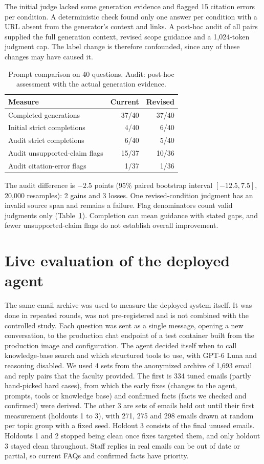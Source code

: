 \documentclass[a4paper,10pt,twocolumn]{article}
\begin{document}
The initial judge lacked some generation evidence and flagged 15 citation errors per condition. A deterministic check found only one answer per condition with a URL absent from the generator's context and links. A post-hoc audit of all pairs supplied the full generation context, revised scope guidance and a 1,024-token judgment cap. The label change is therefore confounded, since any of these changes may have caused it.
\begin{table}[t]
\centering\small
\caption{Prompt comparison on 40 questions. Audit: post-hoc assessment with the actual generation evidence.}\label{tab:followup}
\begin{tabular}{lrr}
\toprule
Measure & Current & Revised\\
\midrule
Completed generations & 37/40 & 37/40\\
Initial strict completions & 4/40 & 6/40\\
Audit strict completions & 6/40 & 5/40\\
Audit unsupported-claim flags & 15/37 & 10/36\\
Audit citation-error flags & 1/37 & 1/36\\
\bottomrule
\end{tabular}
\end{table}

The audit difference is $-2.5$ points (95\% paired bootstrap interval $[-12.5,7.5]$, 20,000 resamples): 2 gains and 3 losses. One revised-condition judgment has an invalid source span and remains a failure. Flag denominators count valid judgments only (Table~\ref{tab:followup}). Completion can mean guidance with stated gaps, and fewer unsupported-claim flags do not establish overall improvement.


\section{Live evaluation of the deployed agent}\label{sec:live}
The same email archive was used to measure the deployed system itself. It was done in repeated rounds, was not pre-registered and is not combined with the controlled study. Each question was sent as a single message, opening a new conversation, to the production chat endpoint of a test container built from the production image and configuration. The agent decided itself when to call knowledge-base search and which structured tools to use, with GPT-6 Luna and reasoning disabled. We used 4 sets from the anonymized archive of 1,693 email and reply pairs that the faculty provided. The first is 334 tuned emails (partly hand-picked hard cases), from which the early fixes (changes to the agent, prompts, tools or knowledge base) and confirmed facts (facts we checked and confirmed) were derived. The other 3 are sets of emails held out until their first measurement (holdouts 1 to 3), with 271, 275 and 298 emails drawn at random per topic group with a fixed seed. Holdout 3 consists of the final unused emails. Holdouts 1 and 2 stopped being clean once fixes targeted them, and only holdout 3 stayed clean throughout. Staff replies in real emails can be out of date or partial, so current FAQs and confirmed facts have priority.
\end{document}
